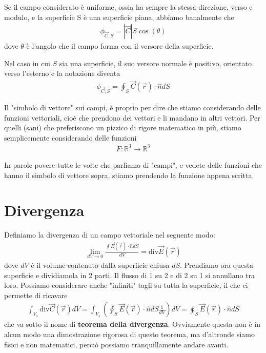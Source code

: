 \documentclass{book}
\begin{document}
Se il campo considerato è uniforme, ossia ha sempre la stessa direzione, verso e modulo, e la superficie S è una superficie piana, abbiamo banalmente che
\begin{align*}
    \phi _{\vec{C}, S} = |\vec{C}| S \cos(\theta)
\end{align*}
dove $\theta$ è l'angolo che il campo forma con il versore della superficie. 

Nel caso in cui $S$ sia una superficie, il suo versore normale è positivo, orientato verso l'esterno e la notazione diventa
\begin{align*}
    \phi_{\vec{C}, S}= \oint_S \vec{C} (\vec{r})\cdot \hat{n}dS 
\end{align*}

Il "simbolo di vettore" sui campi, è proprio per dire che stiamo considerando delle funzioni vettoriali, cioè che prendono dei vettori e li mandano in altri vettori. Per quelli (sani) che preferiscono un pizzico di rigore matematico in più, stiamo semplicemente considerando delle funzioni
\begin{align*}
    F : \mathbb{R}^3\to \mathbb{R}^3
\end{align*}

In parole povere tutte le volte che parliamo di "campi", e vedete delle funzioni che hanno il simbolo di vettore sopra, stiamo prendendo la funzione appena scritta.
\section{Divergenza}
Definiamo la divergenza di un campo vettoriale nel seguente modo:
\begin{align*}
    \lim_{dV\to 0} \frac{\oint \vec{E}(\vec{r})\cdot \hat{n}dS}{dV} = \text{div} \vec{E}(\vec{r})
\end{align*}
dove $dV$ è il volume contenuto dalla superficie chiusa $dS$.
Prendiamo ora questa superficie e dividiamola in 2 parti. Il flusso di 1 su 2 e di 2 su 1 si annullano tra loro.
Possiamo considerare anche "infiniti" tagli su tutta la superficie, il che ci permette di ricavare 
\begin{align*}
    \int_{V_s} \text{div}\vec{C}(\vec{r}) dV = \int _{V_s} \left(\oint _S\vec{E}(\vec{r})\cdot \hat{n}dS \frac{1}{dV}\right) dV = \oint _S\vec{E}(\vec{r})\cdot \hat{n}dS
\end{align*}
che va sotto il nome di \textbf{teorema della divergenza}. Ovviamente questa non è in alcun modo una dimostrazione rigorosa di questo teorema, ma d'altronde siamo fisici e non matematici, perciò possiamo tranquillamente andare avanti.
\end{document}
